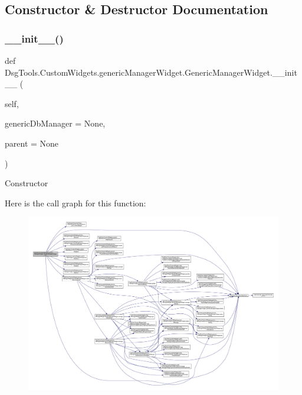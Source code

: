 \subsection{Constructor \& Destructor Documentation}
\mbox{\label{class_dsg_tools_1_1_custom_widgets_1_1generic_manager_widget_1_1_generic_manager_widget_a5f5565d45d66a57f05a9dad0abd6c18a}} 
\subsubsection{\texorpdfstring{\+\_\+\+\_\+init\+\_\+\+\_\+()}{\_\_init\_\_()}}
{\footnotesize\ttfamily def Dsg\+Tools.\+Custom\+Widgets.\+generic\+Manager\+Widget.\+Generic\+Manager\+Widget.\+\_\+\+\_\+init\+\_\+\+\_\+ (\begin{DoxyParamCaption}\item[{}]{self,  }\item[{}]{generic\+Db\+Manager = {\ttfamily None},  }\item[{}]{parent = {\ttfamily None} }\end{DoxyParamCaption})}

\begin{DoxyVerb}Constructor
\end{DoxyVerb}
 Here is the call graph for this function\+:
\nopagebreak
\begin{figure}[H]
\begin{center}
\leavevmode
\includegraphics[width=350pt]{class_dsg_tools_1_1_custom_widgets_1_1generic_manager_widget_1_1_generic_manager_widget_a5f5565d45d66a57f05a9dad0abd6c18a_cgraph}
\end{center}
\end{figure}


